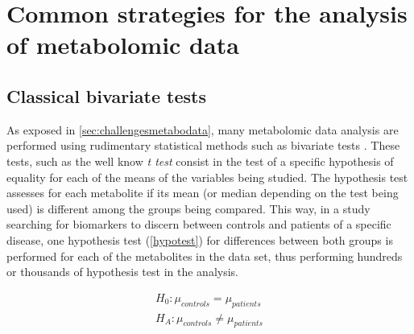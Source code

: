 
\chapter[Common strategies for the analysis of metabolomic data]{Common strategies for the analysis of metabolomic data}



\section{Classical bivariate tests}
\label{bivariate_tests}
As exposed in \autoref{sec:challengesmetabodata}, many metabolomic data analysis are performed using rudimentary statistical methods such as bivariate tests \parencite{saccenti2014reflections}. These tests, such as the well know \textit{t test} consist in the test of a specific hypothesis of equality for each of the means of the variables being studied. The hypothesis test assesses for each metabolite if its mean (or median depending on the test being used) is different among the groups being compared. This way, in a study searching for biomarkers to discern between controls and patients of a specific disease, one hypothesis test (\autoref{hypotest}) for differences between both groups is performed for each of the metabolites in the data set, thus performing hundreds or thousands of hypothesis test in the analysis.

\begin{equation}
\label{hypotest}
\begin{split}
H_0: \mu_{controls} = \mu_{patients} \\
H_A: \mu_{controls} \neq \mu_{patients}
\end{split}
\end{equation}

